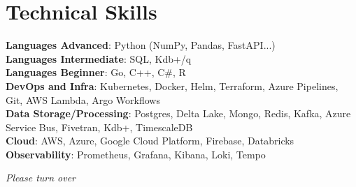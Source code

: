 \documentclass[letterpaper,11pt]{article}
\begin{document}
\section{Technical Skills}
 \begin{itemize}[leftmargin=0.15in, label={}]
    \small{\item{
     \textbf{Languages Advanced}{: Python (NumPy, Pandas, FastAPI...)} \\
     \textbf{Languages Intermediate}{: SQL, Kdb+/q} \\
     \textbf{Languages Beginner}{: Go, C++, C\#, R} \\
     \textbf{DevOps and Infra}{: Kubernetes, Docker, Helm, Terraform, Azure Pipelines, Git, AWS Lambda, Argo Workflows} \\
     \textbf{Data Storage/Processing}{: Postgres, Delta Lake, Mongo, Redis, Kafka, Azure Service Bus, Fivetran, Kdb+, TimescaleDB} \\
     \textbf{Cloud}{: AWS, Azure, Google Cloud Platform, Firebase, Databricks} \\
     \textbf{Observability}{: Prometheus, Grafana, Kibana, Loki, Tempo} \\
    }}
 \end{itemize}
 \vspace{-16pt}

\iffalse
\vfill %
\begin{center}
\textit{Please turn over}
\end{center}
\clearpage %

\vspace{5mm}  %
\end{document}
